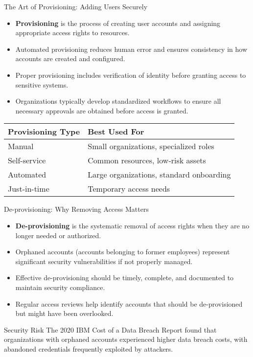 \documentclass{beamer}
\begin{document}
\begin{frame}{The Art of Provisioning: Adding Users Securely}
    \begin{itemize}
        \item \textbf{Provisioning} is the process of creating user accounts and assigning appropriate access rights to resources.
        \item Automated provisioning reduces human error and ensures consistency in how accounts are created and configured.
        \item Proper provisioning includes verification of identity before granting access to sensitive systems.
        \item Organizations typically develop standardized workflows to ensure all necessary approvals are obtained before access is granted.
    \end{itemize}
    
    \begin{table}
        \begin{tabular}{|l|l|}
            \hline
            \textbf{Provisioning Type} & \textbf{Best Used For} \\
            \hline
            Manual & Small organizations, specialized roles \\
            Self-service & Common resources, low-risk assets \\
            Automated & Large organizations, standard onboarding \\
            Just-in-time & Temporary access needs \\
            \hline
        \end{tabular}
    \end{table}
\end{frame}

\begin{frame}{De-provisioning: Why Removing Access Matters}
    \begin{itemize}
        \item \textbf{De-provisioning} is the systematic removal of access rights when they are no longer needed or authorized.
        \item Orphaned accounts (accounts belonging to former employees) represent significant security vulnerabilities if not properly managed.
        \item Effective de-provisioning should be timely, complete, and documented to maintain security compliance.
        \item Regular access reviews help identify accounts that should be de-provisioned but might have been overlooked.
    \end{itemize}
    
    \begin{alertblock}{Security Risk}
        The 2020 IBM Cost of a Data Breach Report found that organizations with orphaned accounts experienced higher data breach costs, with abandoned credentials frequently exploited by attackers.
    \end{alertblock}
\end{frame}
\end{document}
